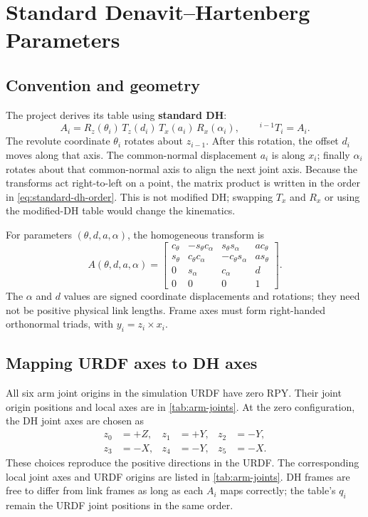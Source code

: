 \chapter{Standard Denavit--Hartenberg Parameters}
\label{ch:dh}

\section{Convention and geometry}
The project derives its table using \textbf{standard DH}:
\begin{equation}
 A_i=R_z(\theta_i)\,T_z(d_i)\,T_x(a_i)\,R_x(\alpha_i),
 \qquad {}^{i-1}T_i=A_i.
 \label{eq:standard-dh-order}
\end{equation}
The revolute coordinate $\theta_i$ rotates about $z_{i-1}$. After this
rotation, the offset $d_i$ moves along that axis. The common-normal displacement
$a_i$ is along $x_i$; finally $\alpha_i$ rotates about that common-normal axis
to align the next joint axis. Because the transforms act right-to-left on a
point, the matrix product is written in the order in \cref{eq:standard-dh-order}.
This is not modified DH; swapping $T_x$ and $R_x$ or using the modified-DH
table would change the kinematics.

For parameters $(\theta,d,a,\alpha)$, the homogeneous transform is
\begin{equation}
 A(\theta,d,a,\alpha)=
 \begin{bmatrix}
 c_\theta&-s_\theta c_\alpha&s_\theta s_\alpha&a c_\theta\\
 s_\theta&c_\theta c_\alpha&-c_\theta s_\alpha&a s_\theta\\
 0&s_\alpha&c_\alpha&d\\0&0&0&1
 \end{bmatrix}.
 \label{eq:dh-general}
\end{equation}
The $\alpha$ and $d$ values are signed coordinate displacements and rotations;
they need not be positive physical link lengths. Frame axes must form
right-handed orthonormal triads, with $y_i=z_i\times x_i$.

\section{Mapping URDF axes to DH axes}
All six arm joint origins in the simulation URDF have zero RPY. Their joint
origin positions and local axes are in \cref{tab:arm-joints}. At the zero
configuration, the DH joint axes are chosen as
\begin{align}
 z_0&=+Z, &z_1&=+Y, &z_2&=-Y,\\
 z_3&=-X, &z_4&=-Y, &z_5&=-X.
\end{align}
These choices reproduce the positive directions in the URDF. The corresponding
local joint axes and URDF origins are listed in \cref{tab:arm-joints}. DH frames are
free to differ from link frames as long as each $A_i$ maps correctly; the
table's $q_i$ remain the URDF joint positions in the same order.

